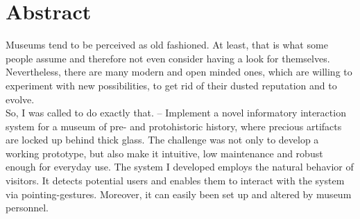 \chapter{Abstract}
\label{abstract}


Museums tend to be perceived as old fashioned. At least, that is what some people assume and therefore not even consider having a look for themselves. Nevertheless, there are many modern and open minded ones, which are willing to experiment with new possibilities, to get rid of their dusted reputation and to evolve.
\\
So, I was called to do exactly that. -- Implement a novel informatory interaction system for a museum of pre- and protohistoric history, where precious artifacts are locked up behind thick glass. The challenge was not only to develop a working prototype, but also make it intuitive, low maintenance and robust enough for everyday use. The system I developed employs the natural behavior of visitors. It detects potential users and enables them to interact with the system via pointing-gestures. Moreover, it can easily been set up and altered by museum personnel.

%
%
%
